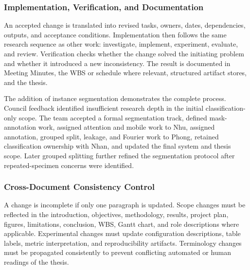 \subsubsection{Implementation, Verification, and Documentation}
An accepted change is translated into revised tasks, owners, dates, dependencies, outputs, and acceptance conditions. Implementation then follows the same research sequence as other work: investigate, implement, experiment, evaluate, and review. Verification checks whether the change solved the initiating problem and whether it introduced a new inconsistency. The result is documented in Meeting Minutes, the WBS or schedule where relevant, structured artifact stores, and the thesis.\par
The addition of instance segmentation demonstrates the complete process. Council feedback identified insufficient research depth in the initial classification-only scope. The team accepted a formal segmentation track, defined mask-annotation work, assigned attention and mobile work to Nhu, assigned annotation, grouped split, leakage, and Fourier work to Phong, retained classification ownership with Nhan, and updated the final system and thesis scope. Later grouped splitting further refined the segmentation protocol after repeated-specimen concerns were identified.\par
\subsubsection{Cross-Document Consistency Control}
A change is incomplete if only one paragraph is updated. Scope changes must be reflected in the introduction, objectives, methodology, results, project plan, figures, limitations, conclusion, WBS, Gantt chart, and role descriptions where applicable. Experimental changes must update configuration descriptions, table labels, metric interpretation, and reproducibility artifacts. Terminology changes must be propagated consistently to prevent conflicting automated or human readings of the thesis.\par
{}
\subsubsection{}
